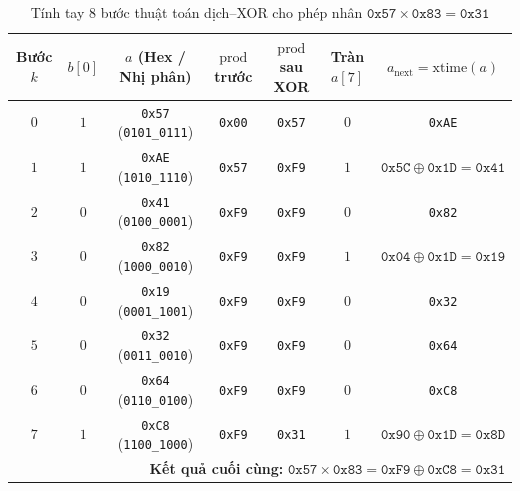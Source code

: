 \documentclass[12pt,a4paper]{report}
\begin{document}
\begin{table}[!htb]
    \centering
    \caption{Tính tay 8 bước thuật toán dịch--XOR cho phép nhân $\texttt{0x57} \times \texttt{0x83} = \texttt{0x31}$}
    \label{tab:mul-trace-57-83}
    \small
    \setlength{\tabcolsep}{4pt}
    \begin{tabular}{@{}ccccccc@{}}
        \toprule
        \textbf{Bước $k$} & \textbf{$b[0]$} & \textbf{$a$ (Hex / Nhị phân)} & \textbf{$\text{prod}$ trước} & \textbf{$\text{prod}$ sau XOR} & \textbf{Tràn $a[7]$} & \textbf{$a_{\text{next}} = \text{xtime}(a)$} \\
        \midrule
        $0$ & $1$ & \texttt{0x57} (\texttt{0101\_0111}) & \texttt{0x00} & \texttt{0x57} & $0$ & \texttt{0xAE} \\
        $1$ & $1$ & \texttt{0xAE} (\texttt{1010\_1110}) & \texttt{0x57} & \texttt{0xF9} & $1$ & $\texttt{0x5C}\oplus\texttt{0x1D}=\texttt{0x41}$ \\
        $2$ & $0$ & \texttt{0x41} (\texttt{0100\_0001}) & \texttt{0xF9} & \texttt{0xF9} & $0$ & \texttt{0x82} \\
        $3$ & $0$ & \texttt{0x82} (\texttt{1000\_0010}) & \texttt{0xF9} & \texttt{0xF9} & $1$ & $\texttt{0x04}\oplus\texttt{0x1D}=\texttt{0x19}$ \\
        $4$ & $0$ & \texttt{0x19} (\texttt{0001\_1001}) & \texttt{0xF9} & \texttt{0xF9} & $0$ & \texttt{0x32} \\
        $5$ & $0$ & \texttt{0x32} (\texttt{0011\_0010}) & \texttt{0xF9} & \texttt{0xF9} & $0$ & \texttt{0x64} \\
        $6$ & $0$ & \texttt{0x64} (\texttt{0110\_0100}) & \texttt{0xF9} & \texttt{0xF9} & $0$ & \texttt{0xC8} \\
        $7$ & $1$ & \texttt{0xC8} (\texttt{1100\_1000}) & \texttt{0xF9} & \texttt{0x31} & $1$ & $\texttt{0x90}\oplus\texttt{0x1D}=\texttt{0x8D}$ \\
        \midrule
        \multicolumn{7}{r}{\textbf{Kết quả cuối cùng:} $\texttt{0x57} \times \texttt{0x83} = \texttt{0xF9} \oplus \texttt{0xC8} = \texttt{0x31}$} \\
        \bottomrule
    \end{tabular}
\end{table}
\end{document}
